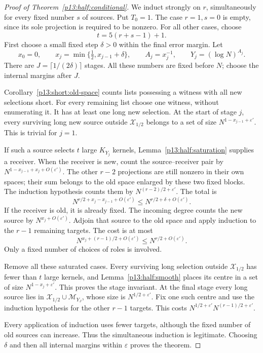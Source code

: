 \begin{proof}[Proof of Theorem~\ref{p13:half:conditional}]
We induct strongly on \(r\), simultaneously for every fixed
number \(s\) of sources. Put \(T_0=1\). The case \(r=1,s=0\)
is empty, since its sole projection is required to be nonzero.
For all other cases, choose
\[
 t=5(r+s-1)+1.
\]
First choose a small fixed step \(\delta>0\) within the
final error margin. Let
\[
 x_0=0,\qquad x_j=\min\{\tfrac12,x_{j-1}+\delta\},
 \qquad A_j=x_j^{-1},\qquad Y_j=(\log N)^{A_j}.
\]
There are \(J=\lceil1/(2\delta)\rceil\) stages.
All these numbers are fixed before \(N\); choose the
internal margins after \(J\).

Corollary~\ref{p13:short:old-space} counts lists possessing
a witness with all new selections short.
For every remaining list choose one witness, without
enumerating it. It has at least one long new selection.
At the start of stage \(j\), every surviving long new
source outside \(\mathcal X_{1/2}\) belongs to a set
of size \(N^{1-x_{j-1}+\varepsilon'}\).
This is trivial for \(j=1\).

If such a source selects \(t\) large \(K_{Y_j}\) kernels,
Lemma~\ref{p13:half:saturation} supplies a receiver.
When the receiver is new, count the source--receiver pair
by \(N^{1-x_{j-1}+x_j+O(\varepsilon')}\).
The other \(r-2\) projections are still nonzero in their
own spaces; their sum belongs to the old space enlarged
by these two fixed blocks. The induction hypothesis counts
them by \(N^{(r-2)/2+\varepsilon'}\).
The total is
\[
 N^{r/2+x_j-x_{j-1}+O(\varepsilon')}
 \le N^{r/2+\delta+O(\varepsilon')}.
\]
If the receiver is old, it is already fixed. The incoming
degree counts the new source by \(N^{x_j+O(\varepsilon')}\).
Adjoin that source to the old space and apply induction
to the \(r-1\) remaining targets. The cost is at most
\[
 N^{x_j+(r-1)/2+O(\varepsilon')}
 \le N^{r/2+O(\varepsilon')}.
\]
Only a fixed number of choices of roles is involved.

Remove all these saturated cases. Every surviving long
selection outside \(\mathcal X_{1/2}\) has fewer than \(t\)
large kernels, and Lemma~\ref{p13:half:smooth} places its
centre in a set of size \(N^{1-x_j+\varepsilon'}\).
This proves the stage invariant.
At the final stage every long source lies in
\(\mathcal X_{1/2}\cup\mathcal M_{Y_J}\), whose size is
\(N^{1/2+\varepsilon'}\).
Fix one such centre and use the induction hypothesis for
the other \(r-1\) targets. This costs
\(N^{1/2+\varepsilon'}N^{(r-1)/2+\varepsilon'}\).

Every application of induction uses fewer targets,
although the fixed number of old sources can increase.
Thus the simultaneous induction is legitimate. Choosing
\(\delta\) and then all internal margins within
\(\varepsilon\) proves the theorem.
\end{proof}
